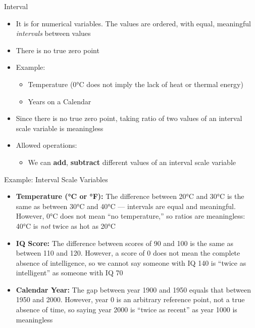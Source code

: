 \documentclass[12pt, aspectratio=169]{beamer}
\begin{document}
	\begin{frame}{Interval}
		\begin{itemize}
			\item It is for numerical variables. The values are ordered, with equal, meaningful \textit{intervals} between values
			\item There is no true zero point
			\item Example:
			\begin{itemize}
				\item Temperature (0°C does not imply the lack of heat or thermal energy)
				\item Years on a Calendar
			\end{itemize}
			\item Since there is no true zero point, taking ratio of two values of an interval scale variable is meaningless
			\item Allowed operations:
			\begin{itemize}
				\item We can \textbf{add}, \textbf{subtract} different values of an interval scale variable
			\end{itemize}
		\end{itemize}
	\end{frame}


	\begin{frame}{Example: Interval Scale Variables}
		\begin{itemize}
			\item \textbf{Temperature (°C or °F):} The difference between 20°C and 30°C is the same as between 30°C and 40°C --- intervals are equal and meaningful. However, 0°C does not mean ``no temperature,'' so ratios are meaningless: 40°C is \textit{not} twice as hot as 20°C
			\item \textbf{IQ Score:} The difference between scores of 90 and 100 is the same as between 110 and 120. However, a score of 0 does not mean the complete absence of intelligence, so we cannot say someone with IQ 140 is ``twice as intelligent'' as someone with IQ 70
			\item \textbf{Calendar Year:} The gap between year 1900 and 1950 equals that between 1950 and 2000. However, year 0 is an arbitrary reference point, not a true absence of time, so saying year 2000 is ``twice as recent'' as year 1000 is meaningless
		\end{itemize}
	\end{frame}
\end{document}

